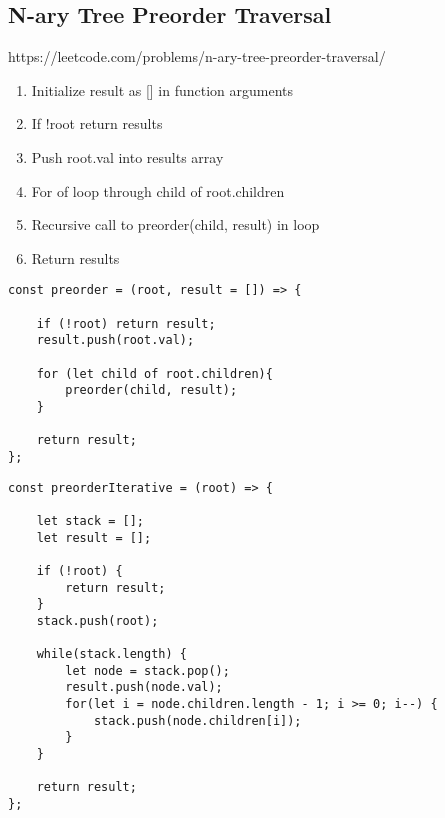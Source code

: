 \documentclass[10pt]{article}
\begin{document}
\medskip %
















\pagebreak
\medskip   
\subsection{N-ary Tree Preorder Traversal}
https://leetcode.com/problems/n-ary-tree-preorder-traversal/

\begin{enumerate}
	\item Initialize result as [] in function arguments
	\item If !root return results 
	\item Push root.val into results array
	\item For of loop through child of root.children
	\item Recursive call to preorder(child, result) in loop
	\item Return results
\end{enumerate}



\begin{lstlisting}[title=Solution preorder recursive, captionpos=t]
const preorder = (root, result = []) => {
    
    if (!root) return result;
    result.push(root.val);
    
    for (let child of root.children){
        preorder(child, result);
    }
    
    return result;
};
\end{lstlisting}



\begin{lstlisting}[title=Solution preorderIterative, captionpos=t]
const preorderIterative = (root) => {

    let stack = [];
    let result = [];

    if (!root) {
        return result;
    }
    stack.push(root);

    while(stack.length) {
        let node = stack.pop();
        result.push(node.val);
        for(let i = node.children.length - 1; i >= 0; i--) {
            stack.push(node.children[i]);
        }
    }

    return result;
};
\end{lstlisting}
\end{document}
